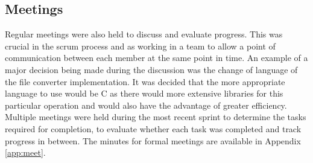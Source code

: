 \subsection{Meetings}
Regular meetings were also held to discuss and evaluate progress. This was crucial in the scrum process and as working in a team to allow a point of communication between each member at the same point in time. An example of a major decision being made during the discussion was the change of language of the file converter implementation. It was decided that the more appropriate language to use would be C as there would more extensive libraries for this particular operation and would also have the advantage of greater efficiency. Multiple meetings were held during the most recent sprint to determine the tasks required for completion, to evaluate whether each task was completed and track progress in between.
The minutes for formal meetings are available in Appendix \ref{app:meet}.
